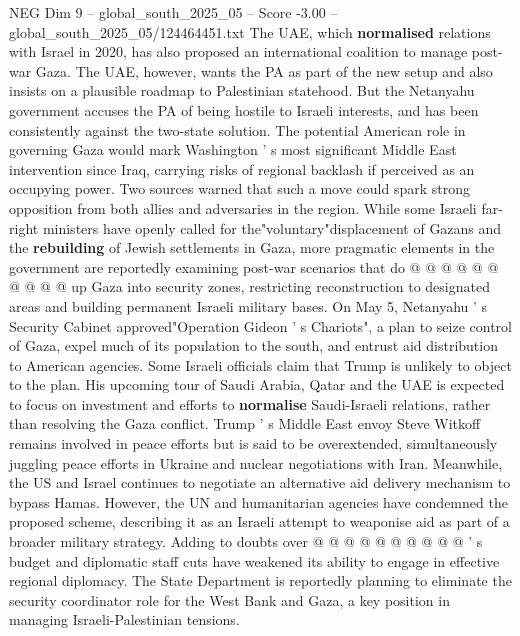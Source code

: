 \begin{textsample}{NEG Dim 9 – global\_south\_2025\_05 – Score -3.00 – global\_south\_2025\_05/124464451.txt}
The UAE, which \textbf{normalised} relations with Israel in 2020, has also proposed an international coalition to manage post-war Gaza.
The UAE, however, wants the PA as part of the new setup and also insists on a plausible roadmap to Palestinian statehood.
But the Netanyahu government accuses the PA of being hostile to Israeli interests, and has been consistently against the two-state solution.
The potential American role in governing Gaza would mark Washington ' s most significant Middle East intervention since Iraq, carrying risks of regional backlash if perceived as an occupying power.
Two sources warned that such a move could spark strong opposition from both allies and adversaries in the region.
While some Israeli far-right ministers have openly called for the"voluntary"displacement of Gazans and the \textbf{rebuilding} of Jewish settlements in Gaza, more pragmatic elements in the government are reportedly examining post-war scenarios that do @ @ @ @ @ @ @ @ @ @ up Gaza into security zones, restricting reconstruction to designated areas and building permanent Israeli military bases.
On May 5, Netanyahu ' s Security Cabinet approved"Operation Gideon ' s Chariots", a plan to seize control of Gaza, expel much of its population to the south, and entrust aid distribution to American agencies.
Some Israeli officials claim that Trump is unlikely to object to the plan.
His upcoming tour of Saudi Arabia, Qatar and the UAE is expected to focus on investment and efforts to \textbf{normalise} Saudi-Israeli relations, rather than resolving the Gaza conflict.
Trump ' s Middle East envoy Steve Witkoff remains involved in peace efforts but is said to be overextended, simultaneously juggling peace efforts in Ukraine and nuclear negotiations with Iran.
Meanwhile, the US and Israel continues to negotiate an alternative aid delivery mechanism to bypass Hamas.
However, the UN and humanitarian agencies have condemned the proposed scheme, describing it as an Israeli attempt to weaponise aid as part of a broader military strategy.
Adding to doubts over @ @ @ @ @ @ @ @ @ @ ' s budget and diplomatic staff cuts have weakened its ability to engage in effective regional diplomacy.
The State Department is reportedly planning to eliminate the security coordinator role for the West Bank and Gaza, a key position in managing Israeli-Palestinian tensions.

\end{textsample}

